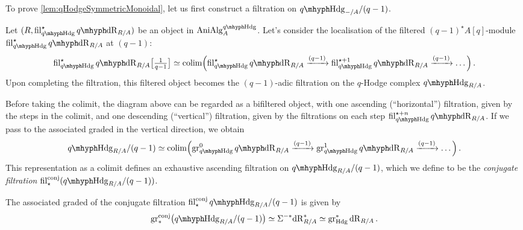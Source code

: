 \documentclass[DIV=12,numbers=enddot,leqno,bibliography=totoc]{scrartcl}
\begin{document}
	To prove \cref{lem:qHodgeSymmetricMonoidal}, let us first construct a filtration on $\qHodge_{-/A}/(q-1)$.%
	
	\begin{numpar}\label{par:ConjugateFiltration}
		Let $(R, \fil_{\qHodge}^\star \qdeRham_{R/A})$ be an object in $\cat{AniAlg}_A^{\qHodge}$. Let's consider the localisation of the filtered $(q-1)^\star A[q]$-module $ \fil_{\qHodge}^\star \qdeRham_{R/A}$ at $(q-1)$:
		\begin{equation*}
			\fil_{\qHodge}^\star \qdeRham_{R/A}\bigl[\localise{q-1}\bigr]\simeq\colimit\Bigl( \fil_{\qHodge}^{\star }\qdeRham_{R/A}\xrightarrow{(q-1)} \fil_{\qHodge}^{\star +1}\qdeRham_{R/A}\xrightarrow{(q-1)}\dotso\Bigr)\,.
		\end{equation*}
		Upon completing the filtration, this filtered object becomes the $(q-1)$-adic filtration on the $q$-Hodge complex $\qHodge_{R/A}$.
		
		Before taking the colimit, the diagram above can be regarded as a bifiltered object, with one ascending (\enquote{horizontal}) filtration, given by the steps in the colimit, and one descending (\enquote{vertical}) filtration, given by the filtrations on each step $ \fil_{\qHodge}^{\star +n}\qdeRham_{R/A}$. If we pass to the associated graded in the vertical direction, we obtain
		\begin{equation*}
			\qHodge_{R/A}/(q-1)\simeq\colimit\Bigl(\gr_{\qHodge}^{0}\qdeRham_{R/A}\xrightarrow{(q-1)}\gr_{\qHodge}^{1}\qdeRham_{R/A}\xrightarrow{(q-1)}\dotso\Bigr)\,.
		\end{equation*}
		This representation as a colimit defines an exhaustive ascending filtration on $\qHodge_{R/A}/(q-1)$, which we define to be the \emph{conjugate filtration} $ \fil_\star ^\mathrm{conj}(\qHodge_{R/A}/(q-1))$.
	\end{numpar}
	\begin{lem}\label{lem:ConjugateFiltration}
		The associated graded of the conjugate filtration $ \fil_\star^\mathrm{conj}\qHodge_{R/A}/(q-1)$ is given by
		\begin{equation*}
			\gr_*^{\mathrm{conj}}\bigl(\qHodge_{R/A}/(q-1)\bigr)\simeq \Sigma^{-*}\deRham_{R/A}^*\simeq\gr_{\Hodge}^*\deRham_{R/A}\,.
		\end{equation*}
	\end{lem}
\end{document}
